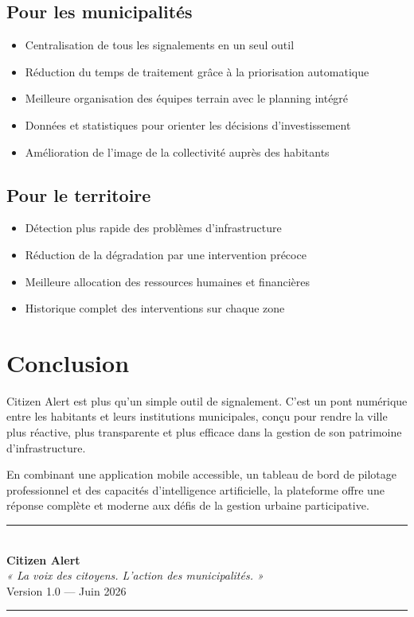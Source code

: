 \documentclass[12pt, a4paper]{article}
\begin{document}
\subsection{Pour les municipalités}

\begin{itemize}[leftmargin=*]
  \item Centralisation de tous les signalements en un seul outil
  \item Réduction du temps de traitement grâce à la priorisation automatique
  \item Meilleure organisation des équipes terrain avec le planning intégré
  \item Données et statistiques pour orienter les décisions d'investissement
  \item Amélioration de l'image de la collectivité auprès des habitants
\end{itemize}

\subsection{Pour le territoire}

\begin{itemize}[leftmargin=*]
  \item Détection plus rapide des problèmes d'infrastructure
  \item Réduction de la dégradation par une intervention précoce
  \item Meilleure allocation des ressources humaines et financières
  \item Historique complet des interventions sur chaque zone
\end{itemize}

\section{Conclusion}

Citizen Alert est plus qu'un simple outil de signalement. C'est un pont numérique entre les habitants et leurs institutions municipales, conçu pour rendre la ville plus réactive, plus transparente et plus efficace dans la gestion de son patrimoine d'infrastructure.

En combinant une application mobile accessible, un tableau de bord de pilotage professionnel et des capacités d'intelligence artificielle, la plateforme offre une réponse complète et moderne aux défis de la gestion urbaine participative.

\vspace{1cm}

\begin{center}
  {\color{primary}\rule{0.5\textwidth}{1pt}}\\[0.5cm]
  {\large\bfseries\color{dark} Citizen Alert}\\[0.3cm]
  {\color{muted}\itshape « La voix des citoyens. L'action des municipalités. »}\\[0.3cm]
  {\small\color{muted} Version 1.0 — Juin 2026}
  \\[0.5cm]
  {\color{primary}\rule{0.5\textwidth}{1pt}}
\end{center}
\end{document}
